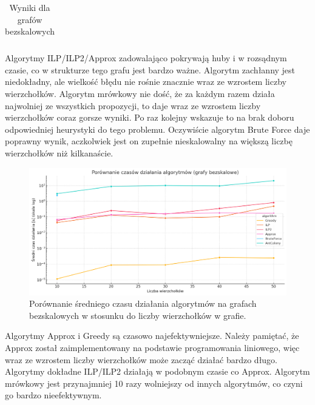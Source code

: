 \begin{table}[H]
\begin{tabular}{|c|c|c|c|c|}
    \hline
    \end{tabular}
    \caption{Wyniki dla grafów bezskalowych}
    \end{table}

    Algorytmy ILP/ILP2/Approx zadowalająco pokrywają huby i w rozsądnym czasie, co w strukturze tego grafu jest bardzo ważne. Algorytm zachłanny jest niedokładny, ale wielkość błędu nie rośnie znacznie wraz ze wzrostem liczby wierzchołków. Algorytm mrówkowy nie dość, że za każdym razem działa najwolniej ze wszystkich propozycji, to daje wraz ze wzrostem liczby wierzchołków coraz gorsze wyniki. Po raz kolejny wskazuje to na brak doboru odpowiedniej heurystyki do tego problemu. Oczywiście algorytm Brute Force daje poprawny wynik, aczkolwiek jest on zupełnie nieskalowalny na większą liczbę wierzchołków niż kilkanaście.

    \begin{figure}[H]
        \centering
        \includegraphics[width=\textwidth]{assets/scaleFree.png}
        \caption{Porównanie średniego czasu działania algorytmów na grafach bezskalowych w stosunku do liczby wierzchołków w grafie.}
        \label{fig:scaleFreePlot}
    \end{figure}

    Algorytmy Approx i Greedy są czasowo najefektywniejsze. Należy pamiętać, że Approx został zaimplementowany na podstawie programowania liniowego, więc wraz ze wzrostem liczby wierzchołków może zacząć działać bardzo długo. Algorytmy dokładne ILP/ILP2 działają w podobnym czasie co Approx. Algorytm mrówkowy jest przynajmniej 10 razy wolniejszy od innych algorytmów, co czyni go bardzo nieefektywnym.

